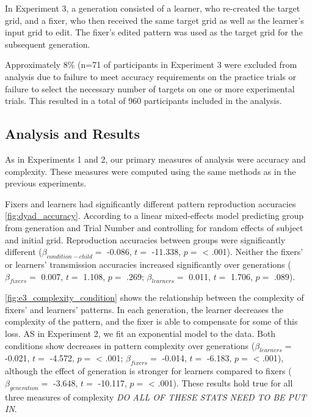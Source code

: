 \documentclass[10pt, letterpaper]{article}
\begin{document}
In Experiment 3, a generation consisted of a learner, who re-created the
target grid, and a fixer, who then received the same target grid as well
as the learner's input grid to edit. The fixer's edited pattern was used
as the target grid for the subsequent generation.

Approximately 8\% (n=71 of participants in Experiment 3 were excluded
from analysis due to failure to meet accuracy requirements on the
practice trials or failure to select the necessary number of targets on
one or more experimental trials. This resulted in a total of 960
participants included in the analysis.

\hypertarget{analysis-and-results}{%
\subsection{Analysis and Results}\label{analysis-and-results}}

As in Experiments 1 and 2, our primary measures of analysis were
accuracy and complexity. These measures were computed using the same
methods as in the previous experiments.

Fixers and learners had significantly different pattern reproduction
accuracies \ref{fig:dyad_accuracy}. According to a linear mixed-effects
model predicting group from generation and Trial Number and controlling
for random effects of subject and initial grid. Reproduction accuracies
between groups were significantly different
(\(\beta_{condition-child} =\) -0.086, \(t =\) -11.338, \(p =\)
\textless{} .001). Neither the fixers' or learners' transmission
accuracies increased significantly over generations
(\(\beta_{fixers} =\) 0.007, \(t =\) 1.108, \(p =\) .269;
\(\beta_{learners} =\) 0.011, \(t =\) 1.706, \(p =\) .089).

\ref{fig:e3_complexity_condition} shows the relationship between the
complexity of fixers' and learners' patterns. In each generation, the
learner decreases the complexity of the pattern, and the fixer is able
to compensate for some of this loss. AS in Experiment 2, we fit an
exponential model to the data. Both conditions show decreases in pattern
complexity over generations (\(\beta_{learners} =\) -0.021, \(t =\)
-4.572, \(p =\) \textless{} .001; \(\beta_{fixers} =\) -0.014, \(t =\)
-6.183, \(p =\) \textless{} .001), although the effect of generation is
stronger for learners compared to fixers (\(\beta_{generation} =\)
-3.648, \(t =\) -10.117, \(p =\) \textless{} .001). These results hold
true for all three measures of complexity \emph{DO ALL OF THESE STATS
NEED TO BE PUT IN}.
\end{document}
